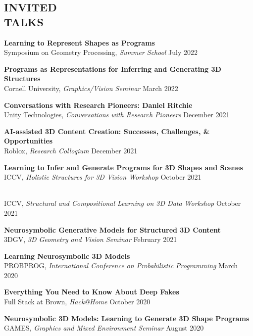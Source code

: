 \documentclass[line,margin]{res}
\begin{document}
\begin{resume}

\section{INVITED\\TALKS}

\newcommand{\talktitle}[1]{
	\textbf{#1}
}
\newcommand{\talk}[3]{
	#1, \emph{#2} \hfill #3
}

\talktitle{Learning to Represent Shapes as Programs}\\
\talk
	{Symposium on Geometry Processing}
	{Summer School}
	{July 2022}

\talktitle{Programs as Representations for Inferring and Generating 3D Structures}\\
\talk
	{Cornell University}
	{Graphics/Vision Seminar}
	{March 2022}

\talktitle{Conversations with Research Pioneers: Daniel Ritchie}\\
\talk
	{Unity Technologies}
	{Conversations with Research Pioneers}
	{December 2021}

\talktitle{AI-assisted 3D Content Creation: Successes, Challenges, \& Opportunities}\\
\talk
	{Roblox}
	{Research Colloqium}
	{December 2021}

\talktitle{Learning to Infer and Generate Programs for 3D Shapes and Scenes}\\
\talk
	{ICCV}
	{Holistic Structures for 3D Vision Workshop}
	{October 2021}
\\
\talk
	{ICCV}
	{Structural and Compositional Learning on 3D Data Workshop}
	{October 2021}

\talktitle{Neurosymbolic Generative Models for Structured 3D Content}\\
\talk
	{3DGV}
	{3D Geometry and Vision Seminar}
	{February 2021}

\talktitle{Learning Neurosymbolic 3D Models}\\
\talk
	{PROBPROG}
	{International Conference on Probabilistic Programming}
	{March 2020}

\talktitle{Everything You Need to Know About Deep Fakes}\\
\talk
	{Full Stack at Brown}
	{Hack@Home}
	{October 2020}

\talktitle{Neurosymbolic 3D Models: Learning to Generate 3D Shape Programs}\\
\talk
	{GAMES}
	{Graphics and Mixed Environment Seminar}
	{August 2020}


\end{resume}
\end{document}
